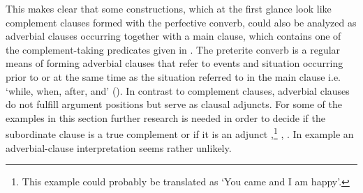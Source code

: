 This makes clear that some constructions, which at the first glance look like complement clauses formed with the perfective converb, could also be analyzed as adverbial clauses occurring together with a main clause, which contains one of the complement-taking predicates given in . The preterite converb is a regular means of forming adverbial clauses that refer to events and situation occurring prior to or at the same time as the situation referred to in the main clause i.e. `while, when, after, and' (). In contrast to complement clauses, adverbial clauses do not fulfill argument positions but serve as clausal adjuncts. For some of the examples in this section further research is needed in order to decide if the subordinate clause is a true complement or if it is an adjunct ,\footnote{This example could probably be translated as `You came and I am happy'.} , . In example  an adverbial-clause interpretation seems rather unlikely.

